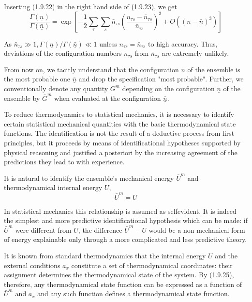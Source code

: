 \documentclass{article}
\begin{document}
Inserting (1.9.22) in the right hand side of (1.9.23), we get
$$
\begin{equation*}
\frac{\Gamma(\underline{n})}{\Gamma(\underline{\bar{n}})}=\exp \left[-\frac{1}{2} \sum_{\tau} \sum_{s} \bar{n}_{\tau s}\left(\frac{n_{\tau s}-\bar{n}_{\tau s}}{\bar{n}_{\tau s}}\right)^{2}+O\left((n-\bar{n})^{3}\right)\right] \tag{1.9.24}
\end{equation*}
$$

As $\bar{n}_{\tau s} \gg 1, \Gamma(\underline{n}) / \Gamma(\underline{\bar{n}}) \ll 1$ unless $n_{\tau s}=\bar{n}_{\tau s}$ to high accuracy. Thus, deviations of the configuration numbers $n_{\tau s}$ from $\bar{n}_{\tau s}$ are extremely unlikely.

From now on, we tacitly understand that the configuration $\underline{n}$ of the ensemble is the most probable one $\underline{\bar{n}}$ and drop the specification "most probable". Further, we conventionally denote any quantity $G^{m}$ depending on the configuration $\underline{n}$ of the ensemble by $\bar{G}^{m}$ when evaluated at the configuration $\underline{\bar{n}}$.

To reduce thermodynamics to statistical mechanics, it is necessary to identify certain statistical mechanical quantities with the basic thermodynamical state functions. The identification is not the result of a deductive process from first principles, but it proceeds by means of identificational hypotheses supported by physical reasoning and justified a posteriori by the increasing agreement of the predictions they lead to with experience.

It is natural to identify the ensemble's mechanical energy $\bar{U}^{m}$ and thermodynamical internal energy $U$,
$$
\begin{equation*}
\bar{U}^{m}=U \tag{1.9.25}
\end{equation*}
$$

In statistical mechanics this relationship is assumed as selfevident. It is indeed the simplest and more predictive identificational hypothesis which can be made: if $\bar{U}^{m}$ were different from $U$, the difference $\bar{U}^{m}-U$ would be a non mechanical form of energy explainable only through a more complicated and less predictive theory.

It is known from standard thermodynamics that the internal energy $U$ and
the external conditions $a_{x}$ constitute a set of thermodynamical coordinates: their assignment determines the thermodynamical state of the system. By (1.9.25), therefore, any thermodynamical state function can be expressed as a function of $\bar{U}^{m}$ and $a_{x}$ and any such function defines a thermodynamical state function.
\end{document}
